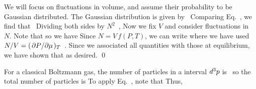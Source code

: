 {	We will focus on fluctuations in volume, and assume their probability to be Gaussian distributed.  The Gaussian distribution is given by~\cite[p.~345]{Landau}
	Comparing Eq.~, we find that~\cite[p.~350]{Landau}
	Dividing both sides by $N^2$~\cite[p.~351]{Landau},
	Now we fix $V$ and consider fluctuations in $N$.  Note that
	so we have
	Since $N = V \,f(P, T)$, we can write
	where we have used $N / V = (\pdv*{P}{\mu})_T$~\cite[pp.~351--352]{Landau}.  Since we associated all quantities with those at equilibrium, we have shown that
	as desired. \qed
	
	For a classical Boltzmann gas, the number of particles in a interval $\dd[3]{p}$ is~\cite[pp.~108--109]{Landau}
	so the total number of particles is
	To apply Eq.~, note that
	Thus,
	
}
